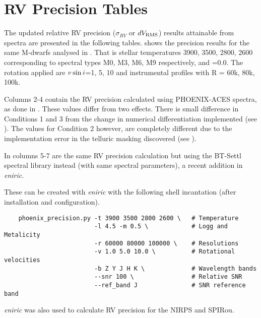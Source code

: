 
\chapter{RV Precision Tables} %

\label{app:nir_prec_amendment}

The updated relative RV precision ($\sigma_{RV}$ or $dV_{\textrm{RMS}}$) results attainable from \nir{} spectra are presented in the following tables.
 shows the precision results for the same M-dwarfs analysed in \citep{figueira_radial_2016}.
That is stellar temperatures 3900, 3500, 2800, 2600\K{} corresponding to spectral types M0, M3, M6, M9 respectively,  and \feh{}=0.0.
The rotation applied are $v\sin{i}{}$=1, 5, 10\kmps{} and instrumental profiles with R = 60k, 80k, 100k.

Columns 2-4 contain the RV precision calculated using {PHOENIX-ACES} spectra, as done in \citet{figueira_radial_2016}.
These values differ from two effects.
There is small difference in Conditions 1 and 3 from the change in numerical differentiation implemented (see ).
The values for Condition 2 however, are completely different due to the implementation error in the telluric masking discovered (see ).

In columns 5-7 are the same RV precision calculation but using the {BT-Settl} spectral library instead (with same spectral parameters), a recent addition in \emph{eniric}.


These can be created with \emph{eniric} with the following shell incantation (after installation and configuration).


\begin{lstlisting}
    phoenix_precision.py -t 3900 3500 2800 2600 \   # Temperature
                         -l 4.5 -m 0.5 \            # Logg and Metalicity
                         -r 60000 80000 100000 \    # Resolutions
                         -v 1.0 5.0 10.0 \          # Rotational velocities
                         -b Z Y J H K \             # Wavelength bands
                         --snr 100 \                # Relative SNR
                         --ref_band J               # SNR reference band
\end{lstlisting}


\emph{eniric} was also used to calculate {RV} precision for the {NIRPS} and {SPIRou}.


